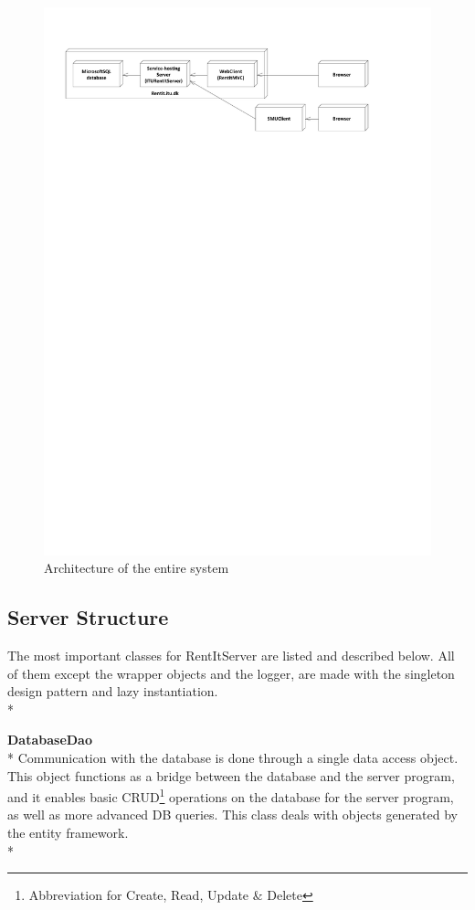 \documentclass[a4paper,11pt,report]{article}
\begin{document}
\begin{figure}[H]
  \centering
\includegraphics[keepaspectratio=true,trim=60pt 650pt 60pt 50pt]{./overallArchitecture.pdf}
\caption{Architecture of the entire system}
\end{figure}

\subsection{Server Structure}
The most important classes for RentItServer are listed and described below. All of them except the wrapper objects and the logger, are made with the singleton design pattern and lazy instantiation.\\*

\textbf{DatabaseDao} \\*
Communication with the database is done through a single data access object. This object functions as a bridge between the database and the server program, and it enables basic CRUD\footnote{Abbreviation for Create, Read, Update \& Delete} operations on the database for the server program, as well as more advanced DB queries. This class deals with objects generated by the entity framework. \\*
\end{document}

